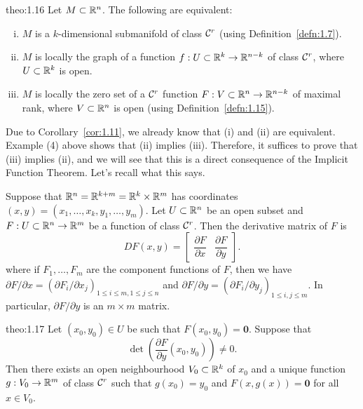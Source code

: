 \begin{theo}{theo:1.16}
    Let $M \subset \mathbb{R}^n$. The following are equivalent: 
    \begin{enumerate}[(i)]
        \item $M$ is a $k$-dimensional submanifold of class ${\cal C}^r$ (using Definition~\ref{defn:1.7}).
        \item $M$ is locally the graph of a function $f : U \subset \mathbb{R}^k \to \mathbb{R}^{n-k}$ 
        of class ${\cal C}^r$, where $U \subset \mathbb{R}^k$ is open. 
        \item $M$ is locally the zero set of a ${\cal C}^r$ function $F : V \subset \mathbb{R}^n 
        \to \mathbb{R}^{n-k}$ of maximal rank, where $V \subset \mathbb{R}^n$ is open 
        (using Definition~\ref{defn:1.15}).
    \end{enumerate}
\end{theo}\vspace{-0.25cm}

Due to Corollary~\ref{cor:1.11}, we already know that (i) and (ii) are 
equivalent. Example (4) above shows that (ii) implies (iii). Therefore, 
it suffices to prove that (iii) implies (ii), and we will see that this is a 
direct consequence of the Implicit Function Theorem. Let's recall what this says.

Suppose that $\mathbb{R}^n = \mathbb{R}^{k+m} = \mathbb{R}^k \times \mathbb{R}^m$ has coordinates $(x, y) 
= (x_1, \dots, x_k, y_1, \dots, y_m)$. Let $U \subset \mathbb{R}^n$ be an open subset 
and $F : U \subset \mathbb{R}^n \to \mathbb{R}^m$ be a function of class ${\cal C}^r$. Then the 
derivative matrix of $F$ is 
\[ DF(x, y) = \left[ \begin{array}{c|c} 
    \dfrac{\partial F}{\partial x} & \dfrac{\partial F}{\partial y} 
\end{array} \right]. \]
where if $F_1, \dots, F_m$ are the component functions of $F$, 
then we have $\partial F/\partial x = (\partial F_i/\partial x_j)_{1\leq i\leq m, 
1\leq j\leq n}$ and $\partial F/\partial y = 
(\partial F_i/\partial y_j)_{1\leq i, j\leq m}$. In particular, 
$\partial F/\partial y$ is an $m \times m$ matrix.

\begin{theo}{theo:1.17}
    Let $(x_0, y_0) \in U$ be such that $F(x_0, y_0) = \mathbf 0$. Suppose that 
    \[ \det\left( \frac{\partial F}{\partial y}(x_0, y_0) \right) \neq 0. \] 
    Then there exists an open neighbourhood $V_0 \subset \mathbb{R}^k$ of $x_0$ 
    and a unique function $g : V_0 \to \mathbb{R}^m$ of class ${\cal C}^r$ such that 
    $g(x_0) = y_0$ and $F(x, g(x)) = \mathbf 0$ for all $x \in V_0$. 
\end{theo}\vspace{-0.25cm}

